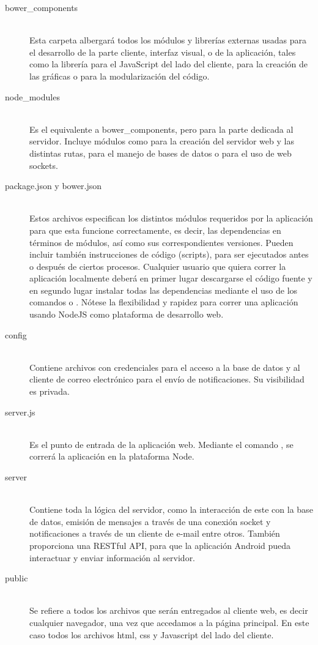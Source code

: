\begin{description}
\item[bower\_components] \\ Esta carpeta albergará todos los módulos y librerías externas usadas para el desarrollo de la parte cliente, interfaz visual, o  de la aplicación, tales como la librería  para el JavaScript del lado del cliente,  para la creación de las gráficas o  para la modularización del código.
\item[node\_modules] \\ Es el equivalente a bower\_components, pero para la parte dedicada al servidor. Incluye módulos como  para la creación del servidor web y las distintas rutas,  para el manejo de bases de datos o  para el uso de web sockets.
\item[package.json y bower.json] \\ Estos archivos especifican los distintos módulos requeridos por la aplicación para que esta funcione correctamente, es decir, las dependencias en términos de módulos, así como sus correspondientes versiones. Pueden incluir también instrucciones de código (scripts), para ser ejecutados antes o después de ciertos procesos. Cualquier usuario que quiera correr la aplicación localmente deberá en primer lugar descargarse el código fuente y en segundo lugar instalar todas las dependencias mediante el uso de los comandos  o .
Nótese la flexibilidad y rapidez para correr una aplicación usando NodeJS como plataforma de desarrollo web.
\item[config] \\ Contiene archivos con credenciales para el acceso a la base de datos y al cliente de correo electrónico para el envío de notificaciones. Su visibilidad es privada.
\item[server.js] \\ Es el punto de entrada de la aplicación web. Mediante el comando  , se correrá la aplicación en la plataforma Node.
\item[server] \\ Contiene toda la lógica del servidor, como la interacción de este con la base de datos, emisión de mensajes a través de una conexión socket y notificaciones a través de un cliente de e-mail entre otros. También proporciona una RESTful API, para que la aplicación Android pueda interactuar y enviar información al servidor.
\item[public] \\ Se refiere a todos los archivos que serán entregados al cliente web, es decir cualquier navegador, una vez que accedamos a la página principal. En este caso todos los archivos html, css y Javascript del lado del cliente.
\end{description}

